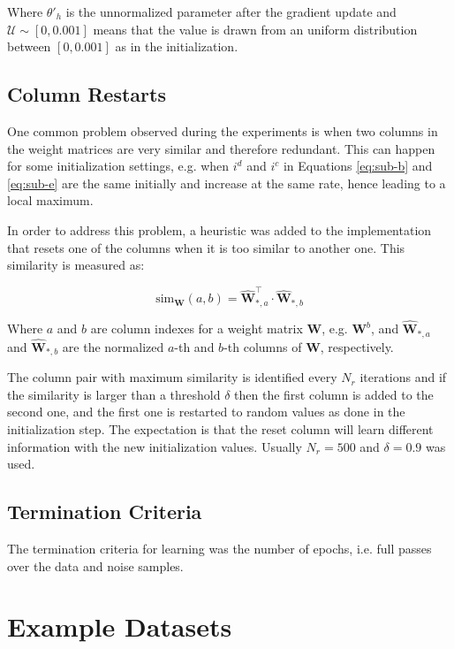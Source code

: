 Where $\theta'_{h}$ is the unnormalized parameter after the gradient update and $\mathcal{U} \sim [0, 0.001]$ means that the value is drawn from an uniform distribution between $[0, 0.001]$ as in the initialization.

\subsection{Column Restarts}

One common problem observed during the experiments is when two columns in the weight matrices are very similar and therefore redundant. This can happen for some initialization settings, e.g. when $i^{d}$ and $i^{c}$ in Equations \eqref{eq:sub-b} and \eqref{eq:sub-e} are the same initially and increase at the same rate, hence leading to a local maximum.

In order to address this problem, a heuristic was added to the implementation that resets one of the columns when it is too similar to another one. This similarity is measured as:

\begin{equation}
  \mathrm{sim}_{\mathbf{W}}(a,b) = \hat{\mathbf{W}}_{*,a}^{\intercal} \cdot \hat{\mathbf{W}}_{*,b}
\end{equation}

Where $a$ and $b$ are column indexes for a weight matrix $\mathbf{W}$, e.g. $\mathbf{W}^{b}$, and $\hat{\mathbf{W}}_{*,a}$ and $\hat{\mathbf{W}}_{*,b}$ are the normalized $a$-th and $b$-th columns of $\mathbf{W}$, respectively.

The column pair with maximum similarity is identified every $N_{r}$ iterations and if the similarity is larger than a threshold $\delta$ then the first column is added to the second one, and the first one is restarted to random values as done in the initialization step. The expectation is that the reset column will learn different information with the new initialization values. Usually $N_{r} = 500$ and $\delta = 0.9$ was used.

\subsection{Termination Criteria}

The termination criteria for learning was the number of epochs, i.e. full passes over the data and noise samples.

\section{Example Datasets}

